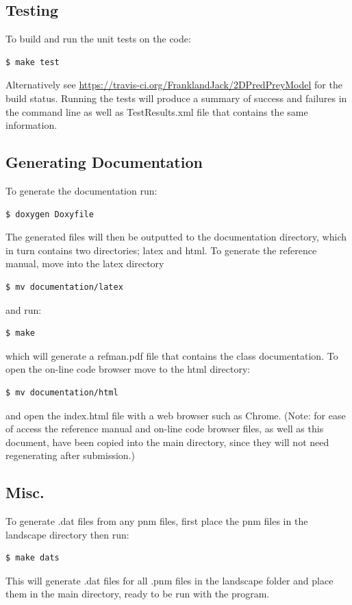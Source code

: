 \subsection{Testing}
To build and run the unit tests on the code:
\begin{lstlisting}[language=bash]
$ make test
\end{lstlisting}
Alternatively see \url{https://travis-ci.org/FranklandJack/2DPredPreyModel} for the build status. Running the tests will produce a summary of success and failures in the command line as well as TestResults.xml file that contains the same information.

\subsection{Generating Documentation}
To generate the documentation run:
\begin{lstlisting}[language=bash]
$ doxygen Doxyfile
\end{lstlisting}
The generated files will then be outputted to the documentation directory, which in turn contains two directories; latex and html. To generate the reference manual, move into the latex directory
\begin{lstlisting}[language=bash]
$ mv documentation/latex
\end{lstlisting}
and run:
\begin{lstlisting}[language=bash]
$ make
\end{lstlisting}
which will generate a refman.pdf file that contains the class documentation. To open the on-line code browser move to the html directory:
 \begin{lstlisting}[language=bash]
$ mv documentation/html
\end{lstlisting}
and open the index.html file with a web browser such as Chrome.
(Note: for ease of access the reference manual and on-line code browser files, as well as this document, have been copied into the main directory, since they will not need regenerating after submission.)

\subsection{Misc.}
To generate .dat files from any pnm files, first place the pnm files in the landscape directory then run:

\begin{lstlisting}[language=bash]
$ make dats
\end{lstlisting}
This will generate .dat files for all .pnm files in the landscape folder and place them in the main directory, ready to be run with the program. \\



